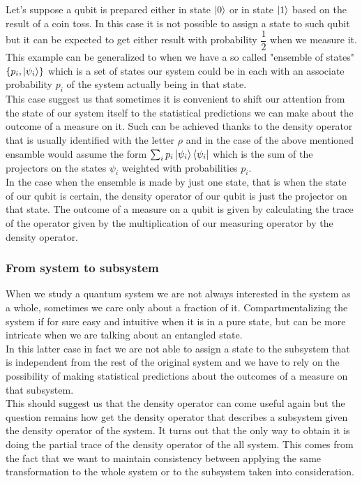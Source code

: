 \documentclass{article}
\begin{document}
Let's suppose a qubit is prepared either in state $\ket{0}$ or in
state $\ket{1}$ based on the result of a coin toss.
In this case it is not possible to assign a state to such qubit
but it can be expected to get either result with probability
$\dfrac{1}{2}$  when we measure it.
This example can be generalized to when we have a so called
"ensemble of states" $\{p_i,\ket{\psi_i}\}$ which is a set of
states our system could be in each with an associate probability $p_i$
of the system actually being in that state.\\
This case suggest us that sometimes it is convenient to
shift our attention from the state of our system itself to the
statistical predictions we can make about the outcome of a measure on it.
Such can be achieved thanks to the density operator that
is usually identified with the letter $\rho$ and in the case of the above
mentioned ensamble would assume the form $\sum_i p_i \ket{\psi_i}\bra{\psi_i}$
which is the sum of the projectors on the states $\psi_i$ weighted with
probabilities $p_i$. \\
In the case when the ensemble is made by just one state,
that is when the state of our qubit is certain,
the density operator of our qubit is just the projector on
that state.
The outcome of a measure on a qubit is given by calculating
the trace of the operator given by the multiplication of our
measuring operator by the density operator.


\subsubsection{From system to subsystem}

When we study a quantum system we are not always interested in the
system as a whole, sometimes we care only about a fraction of it.
Compartmentalizing the system if for sure easy and intuitive when it
is in a pure state, but can be more intricate when we are talking about
an entangled state.\\
In this latter case in fact we are not able to assign a state to the
subsystem that is independent from the rest of the original system
and we have to rely on the possibility of making statistical
predictions about the outcomes of a measure on that subsystem.\\
This should suggest us that the density operator can come useful
again but the question remains how get the density operator that
describes a subsystem given the density operator of the system.
It turns out that the only way to obtain it is doing the partial
trace of the density operator of the all system.
This comes from the fact that we want to maintain consistency between
applying the same transformation to the whole system or to the
subsystem taken into consideration.
\end{document}
